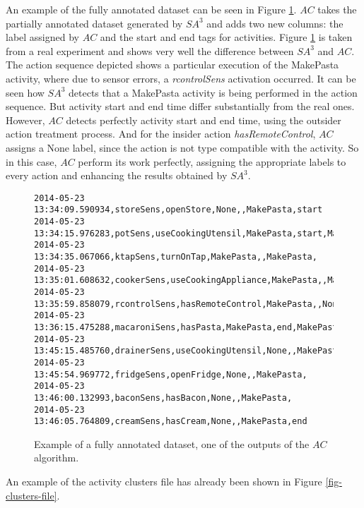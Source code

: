 An example of the fully annotated dataset can be seen in Figure \ref{fig-fully-annotated}. $AC$ takes the partially annotated dataset generated by $SA^3$ and adds two new columns: the label assigned by $AC$ and the start and end tags for activities. Figure \ref{fig-fully-annotated} is taken from a real experiment and shows very well the difference between $SA^3$ and $AC$. The action sequence depicted shows a particular execution of the MakePasta activity, where due to sensor errors, a \textit{rcontrolSens} activation occurred. It can be seen how $SA^3$ detects that a MakePasta activity is being performed in the action sequence. But activity start and end time differ substantially from the real ones. However, $AC$ detects perfectly activity start and end time, using the outsider action treatment process. And for the insider action \textit{hasRemoteControl}, $AC$ assigns a None label, since the action is not type compatible with the activity. So in this case, $AC$ perform its work perfectly, assigning the appropriate labels to every action and enhancing the results obtained by $SA^3$.

\begin{figure}[htbp]
\begin{scriptsize}
\begin{lstlisting}
2014-05-23 13:34:09.590934,storeSens,openStore,None,,MakePasta,start
2014-05-23 13:34:15.976283,potSens,useCookingUtensil,MakePasta,start,MakePasta,
2014-05-23 13:34:35.067066,ktapSens,turnOnTap,MakePasta,,MakePasta,
2014-05-23 13:35:01.608632,cookerSens,useCookingAppliance,MakePasta,,MakePasta,
2014-05-23 13:35:59.858079,rcontrolSens,hasRemoteControl,MakePasta,,None,
2014-05-23 13:36:15.475288,macaroniSens,hasPasta,MakePasta,end,MakePasta,
2014-05-23 13:45:15.485760,drainerSens,useCookingUtensil,None,,MakePasta,
2014-05-23 13:45:54.969772,fridgeSens,openFridge,None,,MakePasta,
2014-05-23 13:46:00.132993,baconSens,hasBacon,None,,MakePasta,
2014-05-23 13:46:05.764809,creamSens,hasCream,None,,MakePasta,end
\end{lstlisting}
\end{scriptsize}
\caption{Example of a fully annotated dataset, one of the outputs of the $AC$ algorithm.}
\label{fig-fully-annotated}
\end{figure}

An example of the activity clusters file has already been shown in Figure \ref{fig-clusters-file}. 